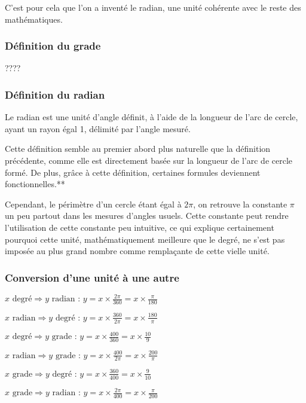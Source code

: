 \documentclass[a4paper]{article}
\begin{document}
				C'est pour cela que l'on a inventé le radian, une unité cohérente avec le reste des mathématiques.

			\subsubsection{Définition du grade}

				????

			\subsubsection{Définition du radian}

				Le radian est une unité d'angle définit, à l'aide de la longueur de l'arc de cercle, ayant un rayon égal 1, délimité par l'angle mesuré.

				Cette définition semble au premier abord plus naturelle que la définition précédente, comme elle est directement basée sur la longueur de l'arc de cercle formé. De plus, grâce à cette définition, certaines formules deviennent fonctionnelles.**

				Cependant, le périmètre d'un cercle étant égal à $2 \pi$, on retrouve la constante $\pi$ un peu partout dans les mesures d'angles usuels. Cette constante peut rendre l'utilisation de cette constante peu intuitive, ce qui explique certainement pourquoi cette unité, mathématiquement meilleure que le degré, ne s'est pas imposée au plus grand nombre comme remplaçante de cette vielle unité.

			\subsubsection{Conversion d'une unité à une autre}

				$x \text{ degré} \Rightarrow y \text{ radian : }	y = x \times \frac{2 \pi}{360} = x \times \frac{\pi}{180}$

				$x \text{ radian} \Rightarrow y \text{ degré : }	y = x \times \frac{360}{2 \pi} = x \times \frac{180}{\pi}$

				$x \text{ degré} \Rightarrow y \text{ grade : }	y = x \times \frac{400}{360} = x \times \frac{10}{9}$

				$x \text{ radian} \Rightarrow y \text{ grade : }	y = x \times \frac{400}{2 \pi} = x \times \frac{200}{\pi}$

				$x \text{ grade} \Rightarrow y \text{ degré : }	y = x \times \frac{360}{400} = x \times \frac{9}{10}$

				$x \text{ grade} \Rightarrow y \text{ radian : }	y = x \times \frac{2 \pi}{400} = x \times \frac{\pi}{200}$
\end{document}
